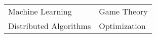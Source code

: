 \begin{tabular}{ll}
  Machine Learning                &Game Theory \\
  Distributed Algorithms          &Optimization \\
\end{tabular}
\medskip
